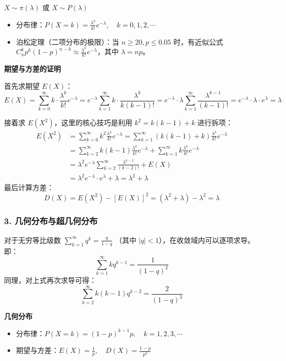$X \sim \pi(\lambda)$ 或 $X \sim P(\lambda)$
\begin{itemize}
    \item 分布律：$P(X=k) = \frac{\lambda^k}{k!} e^{-\lambda}, \quad k=0,1,2,\cdots$
    \item 泊松定理（二项分布的极限）：当 $n \ge 20, p \le 0.05$ 时，有近似公式 $C_n^k p^k (1-p)^{n-k} \approx \frac{\lambda^k}{k!} e^{-\lambda}$，其中 $\lambda = np$。
\end{itemize}

\textbf{期望与方差的证明}\quad

首先求期望 $E(X)$：
$$ E(X) = \sum_{k=0}^{\infty} k \cdot \frac{\lambda^k}{k!} e^{-\lambda} = e^{-\lambda} \sum_{k=1}^{\infty} k \cdot \frac{\lambda^k}{k(k-1)!} = e^{-\lambda} \cdot \lambda \sum_{k=1}^{\infty} \frac{\lambda^{k-1}}{(k-1)!} = e^{-\lambda} \cdot \lambda \cdot e^{\lambda} = \lambda $$

接着求 $E(X^2)$，这里的核心技巧是利用 $k^2 = k(k-1) + k$ 进行拆项：
$$ 
\begin{aligned}
E(X^2) &= \sum_{k=0}^{\infty} k^2 \frac{\lambda^k}{k!} e^{-\lambda} = \sum_{k=1}^{\infty} (k(k-1) + k) \frac{\lambda^k}{k!} e^{-\lambda} \\
&= \sum_{k=2}^{\infty} k(k-1) \frac{\lambda^k}{k!} e^{-\lambda} + \sum_{k=1}^{\infty} k \frac{\lambda^k}{k!} e^{-\lambda} \\
&= \lambda^2 e^{-\lambda} \sum_{k=2}^{\infty} \frac{\lambda^{k-2}}{(k-2)!} + E(X) \\
&= \lambda^2 e^{-\lambda} \cdot e^{\lambda} + \lambda = \lambda^2 + \lambda
\end{aligned}
$$
最后计算方差：
$$ D(X) = E(X^2) - [E(X)]^2 = (\lambda^2 + \lambda) - \lambda^2 = \lambda $$


\vspace{1em}
\subsubsection*{3. 几何分布与超几何分布}

\begin{引理Sec11}[幂级数逐项求导]
	对于无穷等比级数 $\sum_{k=1}^{\infty} q^k = \frac{q}{1-q}$ （其中 $|q| < 1$），在收敛域内可以逐项求导。即：
	$$ \sum_{k=1}^{\infty} k q^{k-1} = \frac{1}{(1-q)^2} $$
	同理，对上式再次求导可得：
	$$ \sum_{k=2}^{\infty} k(k-1) q^{k-2} = \frac{2}{(1-q)^3} $$
\end{引理Sec11}

\textbf{几何分布}
\begin{itemize}
    \item 分布律：$P(X=k) = (1-p)^{k-1}p, \quad k=1,2,3,\cdots$
    \item 期望与方差：$E(X) = \frac{1}{p}, \quad D(X) = \frac{1-p}{p^2}$
\end{itemize}

